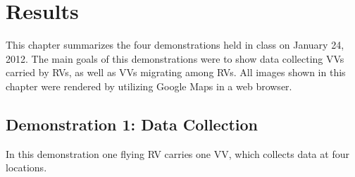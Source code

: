 
\chapter{Results}

This chapter summarizes the four demonstrations held in class on January 24, 2012. The main goals of this
demonstrations were to show data collecting \acp{VV} carried by \acp{RV}, as well as \acp{VV} migrating
among \acp{RV}. All images shown in this chapter were rendered by utilizing Google Maps \cite{GOOGLEMAPS2012} in a web browser.


\section{Demonstration 1: Data Collection}
In this demonstration one flying \ac{RV} carries one \ac{VV}, which collects data at four locations.
